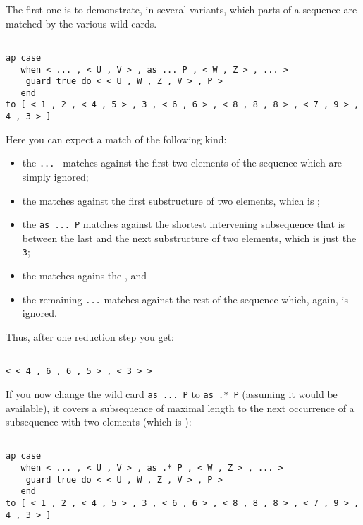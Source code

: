 The first one is to demonstrate, in several variants, which parts of a sequence are matched
by the various wild cards.
\begin{verbatim}

ap case 
   when < ... , < U , V > , as ... P , < W , Z > , ... >
    guard true do < < U , W , Z , V > , P >
   end
to [ < 1 , 2 , < 4 , 5 > , 3 , < 6 , 6 > , < 8 , 8 , 8 > , < 7 , 9 > , 4 , 3 > ]

\end{verbatim}
Here you can expect a match of the following kind: 
\begin{itemize}
\item the {\tt ... } matches against the first two elements of the sequence which are simply
ignored;
\item the {\tt <U,V>} matches against the first substructure of two elements, which is {\tt <4,5>};
\item the {\tt as ... P} matches against the shortest intervening subsequence that is between the last and the next 
substructure of two elements, which is just the {\tt 3};
\item the {\tt <w,z>} matches  agains the {\tt <6,6>}, and
\item the remaining {\tt ...} matches against the rest of the sequence which, again, is
ignored.
\end{itemize}
Thus, after one reduction step you get:
\begin{verbatim}

< < 4 , 6 , 6 , 5 > , < 3 > >

\end{verbatim}
If you now change the wild card {\tt as ... P} to {\tt as .* P} (assuming it would be available), it covers a subsequence
of maximal length to the next occurrence of a subsequence with two elements (which is
{\tt <7,9>}):
\begin{verbatim}

ap case 
   when < ... , < U , V > , as .* P , < W , Z > , ... >
    guard true do < < U , W , Z , V > , P >
   end
to [ < 1 , 2 , < 4 , 5 > , 3 , < 6 , 6 > , < 8 , 8 , 8 > , < 7 , 9 > , 4 , 3 > ]

\end{verbatim}
